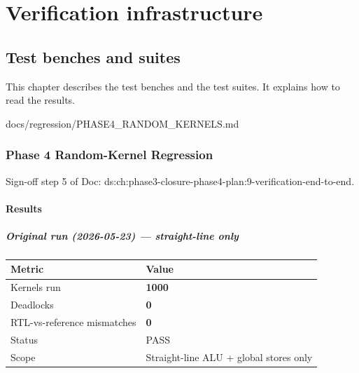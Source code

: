 \part{Verification infrastructure}\label{tm:part:verification-infrastructure}

\chapter{Test benches and suites}\label{tm:ch:test-benches-and-suites}

This chapter describes the test benches and the test suites. It explains how to read the results.

\begin{relocated}{docs/regression/PHASE4_RANDOM_KERNELS.md}
\section{Phase 4 Random-Kernel Regression}\label{tm:suite:phase4-random-kernels}

Sign-off step 5 of Doc:
ds:ch:phase3-closure-phase4-plan:9-verification-end-to-end.

\subsection{Results}\label{tm:suite:phase4-random-kernels:results}

\subsubsection{Original run (2026-05-23) --- straight-line only}\label{tm:suite:phase4-random-kernels:original-run-2026-05-23-straight-line-only}

{
\begin{longtable}[]{@{}ll@{}}
\toprule\noalign{}
Metric & Value \\
\midrule\noalign{}
\endhead
\bottomrule\noalign{}
\endlastfoot
Kernels run & \textbf{1000} \\
Deadlocks & \textbf{0} \\
RTL-vs-reference mismatches & \textbf{0} \\
Status & PASS \\
Scope & Straight-line ALU + global stores only \\
\end{longtable}
}


\end{relocated}
